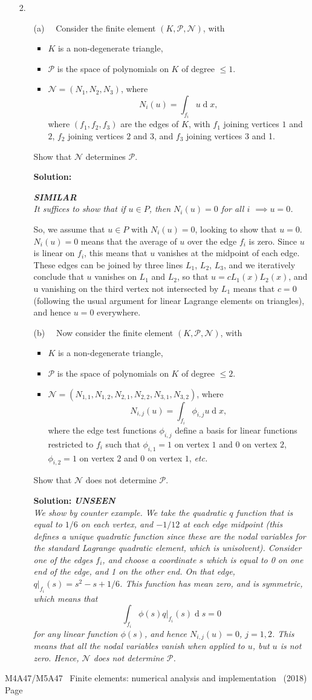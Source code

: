 \documentclass[12pt]{article}
\newcommand{\coursenum}{M4A47/M5A47} %
\newcommand{\coursename}{Finite elements: numerical analysis and implementation} %
\newcommand{\soln}[1]{{\bfseries Solution:} {\itshape \color{blue} #1}}
\newcommand{\soln}[1]{}
\newcommand{\exammarks}[1]{\begin{flushright}[#1 marks]\end{flushright}}%
\DeclareMathOperator{\diff}{d}
\newcommand{\similar}{{\bfseries SIMILAR\\}}
\newcommand{\unseen}{{\bfseries UNSEEN\\}}
\newcommand{\examyear}{2018}
\newenvironment{Question}[1] 
 {\begin{itemize} \item[\large #1.~~]}{\end{itemize} \medskip}
\newcommand{\EndPage}{
	\vfill \coursenum ~ \coursename ~
	(\examyear) \hfill Page \thepage \newpage
	}
\newcommand{\BeginParts}{\begin{itemize}}
\newcommand{\Part}[1]{\item [(#1)~~]}
\newcommand{\EndParts}{\end{itemize}}
\begin{document}
\begin{Question}{2}
\BeginParts
\Part{a}
Consider the finite element $(K,\mathcal{P},\mathcal{N})$, with 
\begin{itemize}
\item $K$ is a non-degenerate triangle,
\item $\mathcal{P}$ is the space of polynomials on $K$ of degree $\leq 1$.
\item $\mathcal{N}=(N_{1},N_{2},N_{3})$,
where 
\[
N_i(u)= \int_{f_i} u\diff x,
\]
where $(f_1,f_2,f_3)$ are the edges of $K$, with $f_1$ joining
vertices $1$ and $2$, $f_2$ joining vertices $2$ and $3$, and $f_3$
joining vertices 3 and 1.
\end{itemize}
Show that $\mathcal{N}$ determines $\mathcal{P}$. \exammarks{10}
\soln{\similar 
  It suffices to show that if $u \in P$, then
   $N_{i}(u)=0$ for all $i$ $\implies u=0$.

   So, we assume that $u\in P$ with $N_{i}(u)=0$, looking to show that
   $u = 0$. $N_i(u)=0$ means that the average of $u$ over the edge
   $f_i$ is zero. Since $u$ is linear on $f_i$, this means that $u$
   vanishes at the midpoint of each edge. These edges can be joined by
   three lines $L_1$, $L_2$, $L_3$, and we iteratively conclude that
   $u$ vanishes on $L_1$ and $L_2$, so that $u=cL_1(x)L_2(x)$, and u
   vanishing on the third vertex not intersected by $L_1$ means that
   $c=0$ (following the usual argument for linear Lagrange elements on
   triangles), and hence $u=0$ everywhere.
 }
 \Part{b} 
  Now consider the finite element $(K,\mathcal{P},\mathcal{N})$, with 
\begin{itemize}
\item $K$ is a non-degenerate triangle,
\item $\mathcal{P}$ is the space of polynomials on $K$ of degree $\leq 2$.
\item $\mathcal{N}=(N_{1,1},N_{1,2},N_{2,1},N_{2,2},N_{3,1},N_{3,2})$,
where 
\[
N_{i,j}(u)= \int_{f_i}\phi_{i,j} u\diff x,
\]
where the edge test functions $\phi_{i,j}$ define
a basis for linear functions restricted to $f_i$ such that $\phi_{i,1}=1$
on vertex $1$ and 0 on vertex $2$, $\phi_{i,2}=1$
on vertex $2$ and 0 on vertex $1$, \emph{etc.}
\end{itemize}
Show that $\mathcal{N}$ does not determine $\mathcal{P}$.
\exammarks{10}
\soln{\unseen We show by counter example. We take the quadratic $q$ function that
  is equal to $1/6$ on each vertex, and $-1/12$ at each edge midpoint
  (this defines a unique quadratic function since these are the nodal
  variables for the standard Lagrange quadratic element, which is
  unisolvent). Consider one of the edges $f_i$, and choose a coordinate $s$
  which is equal to 0 on one end of the edge, and 1 on the other end. On
  that edge, $q|_{f_i}(s)=s^2-s + 1/6$. This function has mean zero, and
  is symmetric, which means that
  \[
  \int_{f_i}\phi(s)q|_{f_i}(s)\diff s=0
  \]
  for any linear function $\phi(s)$, and hence $N_{i,j}(u)=0$, $j=1,2$.
  This means that all the nodal variables vanish when applied to $u$, but
  $u$ is not zero. Hence, $\mathcal{N}$ does not determine $\mathcal{P}$.
} \EndParts
\end{Question}
\EndPage
\end{document}
